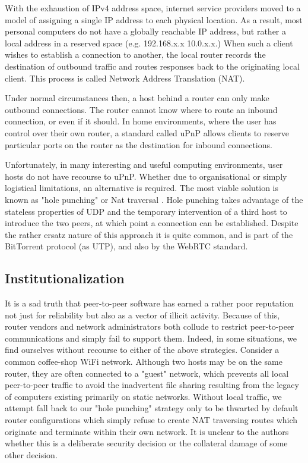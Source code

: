 \documentclass[sigplan,10pt]{acmart}
\begin{document}

With the exhaustion of IPv4 address space, internet service providers moved to a model of assigning a single IP address to each physical location. As a result, most personal computers do not have a globally reachable IP address, but rather a local address in a reserved space (e.g. 192.168.x.x 10.0.x.x.) When such a client wishes to establish a connection to another, the local router records the destination of outbound traffic and routes responses back to the originating local client. This process is called Network Address Translation (NAT).

Under normal circumstances then, a host behind a router can only make outbound connections. The router cannot know where to route an inbound connection, or even if it should. In home environments, where the user has control over their own router, a standard called uPnP allows clients to reserve particular ports on the router as the destination for inbound connections.

Unfortunately, in many interesting and useful computing environments, user hosts do not have recourse to uPnP. Whether due to organisational or simply logistical limitations, an alternative is required. The most viable solution is known as "hole punching" or Nat traversal \cite{NatTraversal}. Hole punching takes advantage of the stateless properties of UDP and the temporary intervention of a third host to introduce the two peers, at which point a connection can be established. Despite the rather ersatz nature of this approach it is quite common, and is part of the BitTorrent protocol (as UTP), and also by the WebRTC standard.   

\subsection{Institutionalization}

It is a sad truth that peer-to-peer software has earned a rather poor reputation not just for reliability but also as a vector of illicit activity. Because of this, router vendors and network administrators both collude to restrict peer-to-peer communications and simply fail to support them. Indeed, in some situations, we find ourselves without recourse to either of the above strategies. Consider a common coffee-shop WiFi network. Although two hosts may be on the same router, they are often connected to a "guest" network, which prevents all local peer-to-peer traffic to avoid the inadvertent file sharing resulting from the legacy of computers existing primarily on static networks. Without local traffic, we attempt fall back to our "hole punching" strategy only to be thwarted by default router configurations which simply refuse to create NAT traversing routes which originate and terminate within their own network. It is unclear to the authors whether this is a deliberate security decision or the collateral damage of some other decision.
\end{document}
